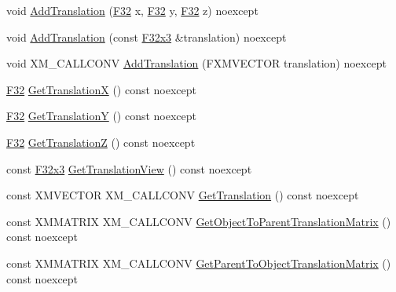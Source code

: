 \begin{DoxyCompactItemize}
\item 
void \mbox{\hyperlink{classmage_1_1_s_q_t_transform3_d_adba7c087084b98f60f8c00e0d60245cd}{Add\+Translation}} (\mbox{\hyperlink{namespacemage_aa97e833b45f06d60a0a9c4fc22ae02c0}{F32}} x, \mbox{\hyperlink{namespacemage_aa97e833b45f06d60a0a9c4fc22ae02c0}{F32}} y, \mbox{\hyperlink{namespacemage_aa97e833b45f06d60a0a9c4fc22ae02c0}{F32}} z) noexcept
\item 
void \mbox{\hyperlink{classmage_1_1_s_q_t_transform3_d_a0cc4526a23a7b0ee56fdc4b19014dce7}{Add\+Translation}} (const \mbox{\hyperlink{namespacemage_a1e3c7a882af461f161caa1cbddaf1fa2}{F32x3}} \&translation) noexcept
\item 
void X\+M\+\_\+\+C\+A\+L\+L\+C\+O\+NV \mbox{\hyperlink{classmage_1_1_s_q_t_transform3_d_a6a0eeedf55fbfc004458124b7b976bcd}{Add\+Translation}} (F\+X\+M\+V\+E\+C\+T\+OR translation) noexcept
\item 
\mbox{\hyperlink{namespacemage_aa97e833b45f06d60a0a9c4fc22ae02c0}{F32}} \mbox{\hyperlink{classmage_1_1_s_q_t_transform3_d_ae3d098ec4b8e92e273e4e521309ca45a}{Get\+TranslationX}} () const noexcept
\item 
\mbox{\hyperlink{namespacemage_aa97e833b45f06d60a0a9c4fc22ae02c0}{F32}} \mbox{\hyperlink{classmage_1_1_s_q_t_transform3_d_adbdcd99be81071e1c34e96d8822b2e8d}{Get\+TranslationY}} () const noexcept
\item 
\mbox{\hyperlink{namespacemage_aa97e833b45f06d60a0a9c4fc22ae02c0}{F32}} \mbox{\hyperlink{classmage_1_1_s_q_t_transform3_d_a17a5f4f0c51e4aafaf18a94222bce615}{Get\+TranslationZ}} () const noexcept
\item 
const \mbox{\hyperlink{namespacemage_a1e3c7a882af461f161caa1cbddaf1fa2}{F32x3}} \mbox{\hyperlink{classmage_1_1_s_q_t_transform3_d_a500661964dc094d294d162606ad0c06d}{Get\+Translation\+View}} () const noexcept
\item 
const X\+M\+V\+E\+C\+T\+OR X\+M\+\_\+\+C\+A\+L\+L\+C\+O\+NV \mbox{\hyperlink{classmage_1_1_s_q_t_transform3_d_a6dd391ac824e4986740021893af96ba3}{Get\+Translation}} () const noexcept
\item 
const X\+M\+M\+A\+T\+R\+IX X\+M\+\_\+\+C\+A\+L\+L\+C\+O\+NV \mbox{\hyperlink{classmage_1_1_s_q_t_transform3_d_abe11b979bf042a36c95b5e90c22fcd5d}{Get\+Object\+To\+Parent\+Translation\+Matrix}} () const noexcept
\item 
const X\+M\+M\+A\+T\+R\+IX X\+M\+\_\+\+C\+A\+L\+L\+C\+O\+NV \mbox{\hyperlink{classmage_1_1_s_q_t_transform3_d_a9d958614bde658f12c2af6e5bb89e44f}{Get\+Parent\+To\+Object\+Translation\+Matrix}} () const noexcept

\end{DoxyCompactItemize}
